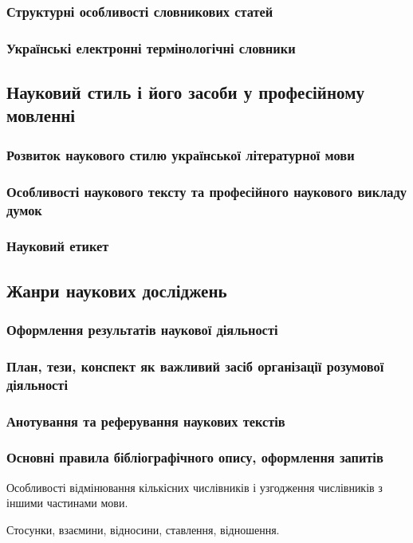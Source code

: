 \documentclass[a4paper,10pt,notitlepage,pdftex,headsepline]{scrartcl}
\begin{document}
      \subsubsection{Структурні особливості словникових статей}
      \subsubsection{Українські електронні термінологічні словники}

  \subsection{Науковий стиль і його засоби у професійному мовленні}
    \subsubsection{Розвиток наукового стилю української літературної мови}
    \subsubsection{Особливості наукового тексту та професійного наукового
    викладу думок}
    \subsubsection{Науковий етикет}
  \subsection{Жанри наукових досліджень}
    \subsubsection{Оформлення результатів наукової діяльності}
    \subsubsection{План, тези, конспект як важливий засіб організації
    розумової діяльності}
    \subsubsection{Анотування та реферування наукових текстів}
    \subsubsection{Основні правила бібліографічного опису, оформлення запитів}


    Особливості відмінювання кількісних числівників і узгодження числівників з
    іншими частинами мови.

    Стосунки, взаємини, відносини, ставлення, відношення.
\end{document}
